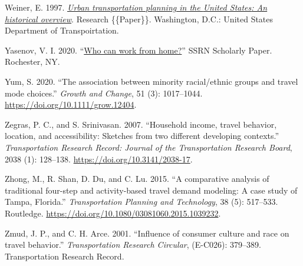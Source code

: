 \documentclass[fancy, twoside, mastersfancy, ms]{byuthesis}
\newlength{\cslhangindent}
\newenvironment{CSLReferences}[2] %
 {\begin{list}{}{%
  \setlength{\itemindent}{0pt}
  \setlength{\leftmargin}{0pt}
  \setlength{\parsep}{0pt}
  \ifodd #1
   \setlength{\leftmargin}{\cslhangindent}
   \setlength{\itemindent}{-1\cslhangindent}
  \fi
  \setlength{\itemsep}{#2\baselineskip}}}
 {\end{list}}
\begin{document}
\begin{CSLReferences}{1}{0}
Weiner, E. 1997. \emph{\href{https://doi.org/10.21949/1526591}{Urban
transportation planning in the {United States}: An historical
overview}}. Research \{\{Paper\}\}. Washington, D.C.: United States
Department of Transpoirtation.

Yasenov, V. I. 2020. {``\href{https://doi.org/10.2139/ssrn.3590895}{Who
can work from home?}''} {SSRN Scholarly Paper}. Rochester, NY.

Yum, S. 2020. {``The association between minority racial/ethnic groups
and travel mode choices.''} \emph{Growth and Change}, 51 (3):
1017--1044. \url{https://doi.org/10.1111/grow.12404}.

Zegras, P. C., and S. Srinivasan. 2007. {``Household income, travel
behavior, location, and accessibility: Sketches from two different
developing contexts.''} \emph{Transportation Research Record: Journal of
the Transportation Research Board}, 2038 (1): 128--138.
\url{https://doi.org/10.3141/2038-17}.

Zhong, M., R. Shan, D. Du, and C. Lu. 2015. {``A comparative analysis of
traditional four-step and activity-based travel demand modeling: A case
study of {Tampa}, {Florida}.''} \emph{Transportation Planning and
Technology}, 38 (5): 517--533. Routledge.
\url{https://doi.org/10.1080/03081060.2015.1039232}.

Zmud, J. P., and C. H. Arce. 2001. {``Influence of consumer culture and
race on travel behavior.''} \emph{Transportation Research Circular},
(E-C026): 379--389. Transportation Research Record.

\end{CSLReferences}
\end{document}
